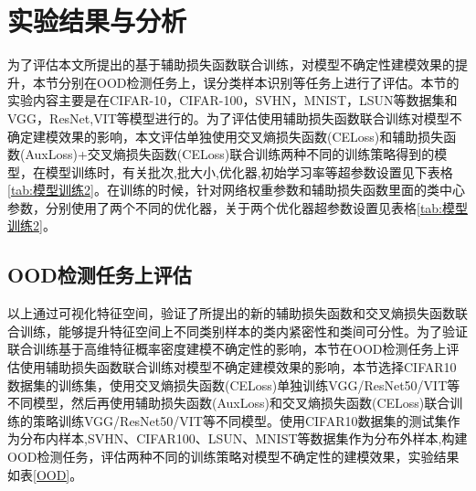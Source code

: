 \section{实验结果与分析}
为了评估本文所提出的基于辅助损失函数联合训练，对模型不确定性建模效果的提升，本节分别在OOD检测任务上，误分类样本识别等任务上进行了评估。本节的实验内容主要是在CIFAR-10，CIFAR-100，SVHN，MNIST，LSUN等数据集和VGG，ResNet,VIT等模型进行的。为了评估使用辅助损失函数联合训练对模型不确定建模效果的影响，本文评估单独使用交叉熵损失函数(CELoss)和辅助损失函数(AuxLoss)+交叉熵损失函数(CELoss)联合训练两种不同的训练策略得到的模型，在模型训练时，有关批次,批大小,优化器,初始学习率等超参数设置见下表格\ref{tab:模型训练2}。在训练的时候，针对网络权重参数和辅助损失函数里面的类中心参数，分别使用了两个不同的优化器，关于两个优化器超参数设置见表格\ref{tab:模型训练2}。
\begin{table}[htbp]
	\captionsetup{font=small, justification=centering}
	\centering
	\caption{
	模型训练超参数设置
	}
        \label{tab:模型训练2}
\end{table}


\subsection{OOD检测任务上评估}

以上通过可视化特征空间，验证了所提出的新的辅助损失函数和交叉熵损失函数联合训练，能够提升特征空间上不同类别样本的类内紧密性和类间可分性。为了验证联合训练基于高维特征概率密度建模不确定性的影响，本节在OOD检测任务上评估使用辅助损失函数联合训练对模型不确定建模效果的影响，本节选择CIFAR10数据集的训练集，使用交叉熵损失函数(CELoss)单独训练VGG/ResNet50/VIT等不同模型，然后再使用辅助损失函数(AuxLoss)和交叉熵损失函数(CELoss)联合训练的策略训练VGG/ResNet50/VIT等不同模型。使用CIFAR10数据集的测试集作为分布内样本,SVHN、CIFAR100、LSUN、MNIST等数据集作为分布外样本,构建OOD检测任务，评估两种不同的训练策略对模型不确定性的建模效果，实验结果如表\ref{OOD}。


